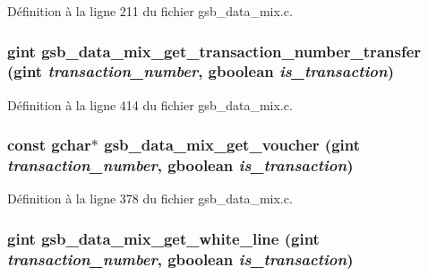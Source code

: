Définition à la ligne 211 du fichier gsb\_\-data\_\-mix.c.

\subsubsection[{gsb\_\-data\_\-mix\_\-get\_\-transaction\_\-number\_\-transfer}]{\setlength{\rightskip}{0pt plus 5cm}gint gsb\_\-data\_\-mix\_\-get\_\-transaction\_\-number\_\-transfer (gint {\em transaction\_\-number}, \/  gboolean {\em is\_\-transaction})}\label{gsb__data__mix_8h_a99e5d9e76610f78b4aa4a5d0693af581}


Définition à la ligne 414 du fichier gsb\_\-data\_\-mix.c.

\subsubsection[{gsb\_\-data\_\-mix\_\-get\_\-voucher}]{\setlength{\rightskip}{0pt plus 5cm}const gchar$\ast$ gsb\_\-data\_\-mix\_\-get\_\-voucher (gint {\em transaction\_\-number}, \/  gboolean {\em is\_\-transaction})}\label{gsb__data__mix_8h_a0dd263006adf896881cca980f22d06c8}


Définition à la ligne 378 du fichier gsb\_\-data\_\-mix.c.

\subsubsection[{gsb\_\-data\_\-mix\_\-get\_\-white\_\-line}]{\setlength{\rightskip}{0pt plus 5cm}gint gsb\_\-data\_\-mix\_\-get\_\-white\_\-line (gint {\em transaction\_\-number}, \/  gboolean {\em is\_\-transaction})}\label{gsb__data__mix_8h_a3dc82f9e36f410db25ad621d29312453}


